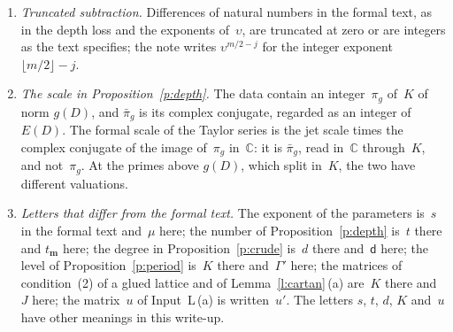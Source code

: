 \documentclass[11pt,a4paper]{article}
\newcommand{\m}[1]{\mbox{$#1$}}        %
\theoremstyle{plainx}
\theoremstyle{uprightx}
\newcommand{\CC}{\mathbb{C}}
\newcommand{\tm}{t_{\mathbf{m}}}              %
\begin{document}
\begin{enumerate}[label=\textup{\arabic*.},leftmargin=1.6em,itemsep=5pt]
\item \emph{Truncated subtraction.} Differences of natural numbers in the formal text, as in the depth loss and
the exponents of~$\upsilon$, are truncated at zero or are integers as the text specifies; the note writes
\m{\upsilon^{m/2-j}} for the integer exponent \m{\lfloor m/2\rfloor-j}.
\item \emph{The scale in Proposition~\ref{p:depth}.} The data contain an integer~$\pi_g$ of~$K$ of norm \m{g(D)}, and
\m{\bar\pi_g} is its complex conjugate, regarded as an integer of \m{E(D)}. The formal scale of the Taylor series is
the jet scale times the complex conjugate of the image of~$\pi_g$ in~$\CC$: it is \m{\bar\pi_g}, read in~$\CC$
through~$K$, and not~$\pi_g$. At the primes above \m{g(D)}, which split in~$K$, the two have different valuations.
\item \emph{Letters that differ from the formal text.} The exponent of the parameters is~$s$ in the formal text
and~$\mu$ here; the number of Proposition~\ref{p:depth} is~$t$ there and \m{\tm} here; the degree in
Proposition~\ref{p:crude} is~$d$ there and~$\mathsf{d}$ here; the level of Proposition~\ref{p:period} is~$K$ there
and~$\Gamma'$ here; the matrices of condition~(2) of a glued lattice and of Lemma~\ref{l:cartan}\,(a) are~$K$ there
and~$J$ here; the matrix~$u$ of Input~L\,(a) is written~$u'$. The letters $s$, $t$, $d$, $K$ and~$u$ have other
meanings in this write-up.
\end{enumerate}
\end{document}
